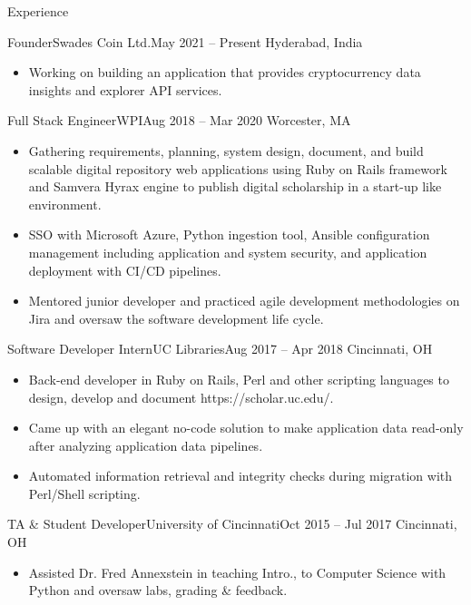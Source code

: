 \documentclass[]{mcdowellcv}
\begin{document}
\begin{cvsection}{Experience}
	\begin{cvsubsection}{Founder}{Swades Coin Ltd.}{May 2021 -- Present}
		Hyderabad, India
		\begin{itemize}%
			\item Working on building an application that provides cryptocurrency data insights and explorer API services.
		\end{itemize}
	\end{cvsubsection}
	\begin{cvsubsection}{Full Stack Engineer}{WPI}{Aug 2018 -- Mar 2020}
		Worcester, MA
		\begin{itemize}%
			\item Gathering requirements, planning, system design, document, and build scalable digital repository web applications using Ruby on Rails framework and Samvera Hyrax engine to publish digital scholarship in a start-up like environment.
			\item SSO with Microsoft Azure, Python ingestion tool, Ansible configuration management including application and system security, and application deployment with CI/CD pipelines.
			\item Mentored junior developer and practiced agile development methodologies on Jira and oversaw the software development life cycle.
		\end{itemize}
	\end{cvsubsection}
	\begin{cvsubsection}{Software Developer Intern}{UC Libraries}{Aug 2017 -- Apr 2018}
		Cincinnati, OH
		\begin{itemize}%
			\item Back-end developer in Ruby on Rails, Perl and other scripting languages to design, develop and document https://scholar.uc.edu/.
			\item Came up with an elegant no-code solution to make application data read-only after analyzing application data pipelines.
			\item Automated information retrieval and integrity checks during migration with Perl/Shell scripting.
		\end{itemize}
	\end{cvsubsection}
	\begin{cvsubsection}{TA \& Student Developer}{University of Cincinnati}{Oct 2015 -- Jul 2017}
		Cincinnati, OH
		\begin{itemize}%
			\item Assisted Dr. Fred Annexstein in teaching Intro., to Computer Science with Python and oversaw labs, grading \& feedback.

\end{itemize}
\end{cvsubsection}
\end{cvsection}
\end{document}
